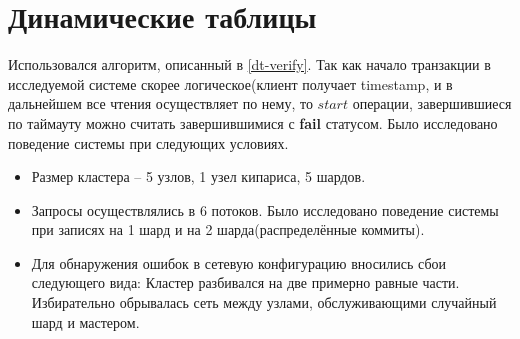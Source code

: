 \documentclass[pdftex,ptm,14pt,a4paper]{extreport}
\theoremstyle{definition}
\begin{document}
\section{Динамические таблицы}
Использовался алгоритм, описанный в \ref{dt-verify}.
Так как начало транзакции в исследуемой системе скорее логическое(клиент получает timestamp, и в дальнейшем
все чтения осуществляет по нему, то $start$ операции, завершившиеся по таймауту можно считать завершившимися
с \textbf{fail} статусом.
Было исследовано поведение системы при следующих условиях.
\begin{itemize}
    \item Размер кластера -- 5 узлов, 1 узел кипариса, 5 шардов.
    \item Запросы осуществлялись в 6 потоков. Было исследовано поведение системы при записях
        на 1 шард и на 2 шарда(распределённые коммиты).
    \item Для обнаружения ошибок в сетевую конфигурацию вносились сбои следующего вида:
        \subitem Кластер разбивался на две примерно равные части.
        \subitem Избирательно обрывалась сеть между узлами, обслуживающими случайный шард и мастером.
\end{itemize}

\printbibliography[title=Список литературы]
\end{document}
